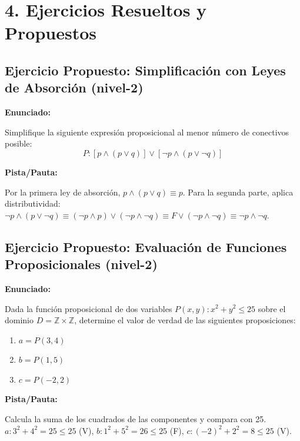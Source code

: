\documentclass[11pt]{article}
\newenvironment{ejercicios}{\section*{4. Ejercicios Resueltos y Propuestos}}{}
\newcommand{\enunciado}[1]{\textbf{Enunciado:}\par#1\par\medskip}
\newenvironment{ejerciciopropuesto}[2]{\subsection*{Ejercicio Propuesto: #1 \hfill \normalfont\small(#2)}}{}
\newcommand{\pista}[1]{\textbf{Pista/Pauta:}\par#1\par\bigskip}
\begin{document}
\begin{ejercicios}
  \begin{ejerciciopropuesto}{Simplificación con Leyes de Absorción}{nivel-2}
    \enunciado{
      Simplifique la siguiente expresión proposicional al menor número de conectivos posible:
      $$ P: [p \wedge (p \vee q)] \vee [\neg p \wedge (p \vee \neg q)] $$
    }
    \pista{
      Por la primera ley de absorción, $p \wedge (p \vee q) \equiv p$. Para la segunda parte, aplica distributividad: $\neg p \wedge (p \vee \neg q) \equiv (\neg p \wedge p) \vee (\neg p \wedge \neg q) \equiv F \vee (\neg p \wedge \neg q) \equiv \neg p \wedge \neg q$.
    }
  \end{ejerciciopropuesto}

  \begin{ejerciciopropuesto}{Evaluación de Funciones Proposicionales}{nivel-2}
    \enunciado{
      Dada la función proposicional de dos variables $P(x, y): x^2 + y^2 \leq 25$ sobre el dominio $D = \mathbb{Z} \times \mathbb{Z}$, determine el valor de verdad de las siguientes proposiciones:
      \begin{enumerate}
        \item $a = P(3, 4)$
        \item $b = P(1, 5)$
        \item $c = P(-2, 2)$
      \end{enumerate}
    }
    \pista{
      Calcula la suma de los cuadrados de las componentes y compara con 25. $a: 3^2+4^2=25 \leq 25$ (V), $b: 1^2+5^2=26 \leq 25$ (F), $c: (-2)^2+2^2=8 \leq 25$ (V).
    }
  \end{ejerciciopropuesto}

\end{ejercicios}
\end{document}
